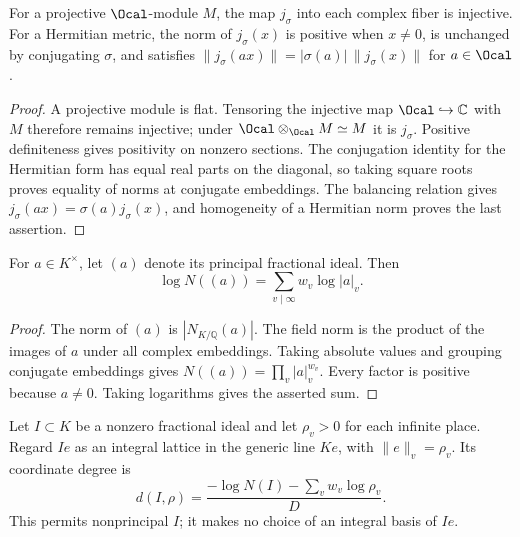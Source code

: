 \begin{lemma}
\label{lem:hermitian-section-norm}
\leanok
For a projective $\Ocal$-module $M$, the map $j_\sigma$ into each complex
fiber is injective. For a Hermitian metric, the norm of $j_\sigma(x)$ is
positive when $x\ne0$, is unchanged by conjugating $\sigma$, and satisfies
$\|j_\sigma(ax)\|=|\sigma(a)|\,\|j_\sigma(x)\|$ for $a\in\Ocal$.
\end{lemma}
\begin{proof}
A projective module is flat. Tensoring the injective map
$\Ocal\hookrightarrow\mathbb C$ with $M$ therefore remains injective;
under $\Ocal\otimes_{\Ocal}M\simeq M$ it is $j_\sigma$.
Positive definiteness gives positivity on nonzero sections. The conjugation
identity for the Hermitian form has equal real parts on the diagonal,
so taking square roots proves equality of norms at conjugate embeddings.
The balancing relation gives $j_\sigma(ax)=\sigma(a)j_\sigma(x)$, and
homogeneity of a Hermitian norm proves the last assertion.
\end{proof}

\begin{lemma}
\label{lem:log-product-formula}
\leanok
For $a\in K^\times$, let $(a)$ denote its principal fractional ideal.
Then
\[
 \log N((a))=\sum_{v\mid\infty} w_v\log|a|_v.
\]
\end{lemma}
\begin{proof}
The norm of $(a)$ is $|N_{K/\mathbb Q}(a)|$. The field norm is the product
of the images of $a$ under all complex embeddings. Taking absolute values
and grouping conjugate embeddings gives
$N((a))=\prod_v |a|_v^{w_v}$. Every factor is positive because $a\ne0$.
Taking logarithms gives the asserted sum.
\end{proof}

\begin{definition}
\label{def:coordinate-line-degree}
\leanok
Let $I\subset K$ be a nonzero fractional ideal and let $\rho_v>0$ for each
infinite place. Regard $Ie$ as an integral lattice in the generic line $Ke$,
with $\|e\|_v=\rho_v$. Its coordinate degree is
\[
 d(I,\rho)=\frac{-\log N(I)-\sum_v w_v\log\rho_v}{D}.
\]
This permits nonprincipal $I$; it makes no choice of an integral basis of
$Ie$.
\end{definition}

